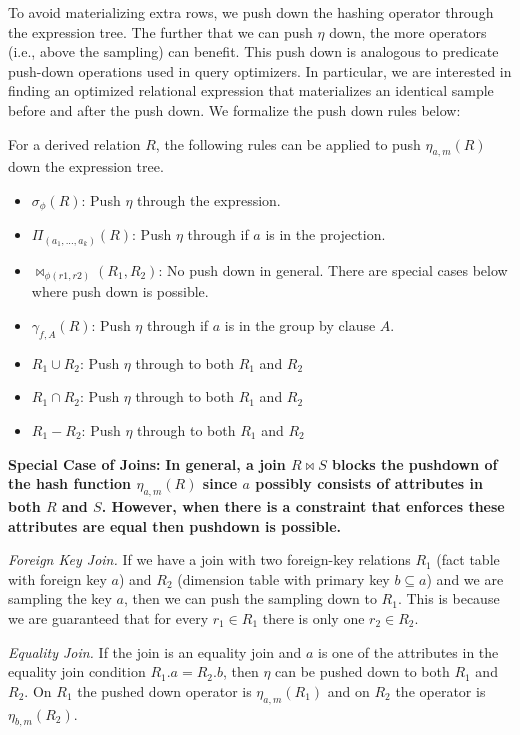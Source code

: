 To avoid materializing extra rows, we push down the hashing operator through the expression tree.
The further that we can push $\eta$ down, the more operators (i.e., above the sampling) can benefit.
This push down is analogous to predicate push-down operations used in query optimizers. 
In particular, we are interested in finding an optimized relational expression that materializes an identical sample before and after the push down.
We formalize the push down rules below:
\begin{definition}
For a derived relation $R$, the following rules can be applied to push $\eta_{a, m}(R)$ down the expression tree. 
\begin{itemize}[noitemsep]
\item $\sigma_{\phi}(R)$: Push $\eta$ through the expression.  
\item $\Pi_{(a_1,...,a_k)}(R)$: Push $\eta $ through if $a$ is in the projection.
\item $\bowtie_{\phi (r1,r2)}(R_1,R_2)$: No push down in general. There are special cases below where push down is possible.
\item $\gamma_{f,A}(R)$: Push $\eta $ through if $a$ is in the group by clause $A$.
\item $R_1 \cup R_2$: Push $\eta $ through to both $R_1$ and $R_2$
\item $R_1 \cap R_2$: Push $\eta $ through to both $R_1$ and $R_2$
\item $R_1 - R_2$: Push $\eta $ through to both $R_1$ and $R_2$
\end{itemize}
\end{definition}

\noindent \textbf{Special Case of Joins: }
\textbf{In general, a join $R \bowtie S$ blocks the pushdown of the hash function $\eta_{a, m}(R)$ since $a$ possibly consists of attributes in both $R$ and $S$.
However, when there is a constraint that enforces these attributes are equal then pushdown is possible.}

\emph{Foreign Key Join. } If we have a join with two foreign-key relations $R_1$ (fact table with foreign key $a$) and $R_2$ (dimension table with primary key $b \subseteq a$) and we are sampling the key $a$, then we can push the sampling down to $R_1$. This is because we are guaranteed that for every $r_1\in R_1$ there is only one $r_2 \in R_2$. 

\emph{Equality Join. } If the join is an equality join and $a$ is one of the attributes in the equality join condition $R_1.a = R_2.b$, then $\eta$ can be pushed down to both $R_1$ and $R_2$. On $R_1$ the pushed down operator is $\eta_{a, m}(R_1)$ and on $R_2$ the operator is $\eta_{b, m}(R_2)$. 

